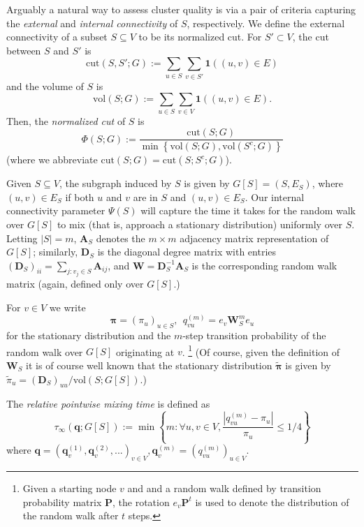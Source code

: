 \documentclass{article}
\newcommand{\set}[1]{\left\{#1\right\}}
\newcommand{\vol}{\mathrm{vol}}
\newcommand{\cut}{\mathrm{cut}}
\newcommand{\abs}[1]{\left \lvert #1 \right \rvert}
\newcommand{\1}{\mathbf{1}}
\newcommand{\qbf}{\mathbf{q}}
\newcommand{\pibf}{\bm{\pi}}
\newcommand{\Abf}{\mathbf{A}}
\newcommand{\Wbf}{\mathbf{W}}
\newcommand{\Dbf}{\mathbf{D}}
\theoremstyle{aldenthm}
\theoremstyle{aldenrmrk}
\begin{document}
Arguably a natural way to assess cluster quality is via a pair of criteria capturing the \emph{external} and \emph{internal connectivity} of $S$, respectively.  We define the external connectivity of a subset $S \subseteq V$ to be its normalized cut. For $S' \subset V$, the cut between $S$ and $S'$ is
\begin{equation*}
\cut(S, S'; G) := \sum_{u \in S} \sum_{v \in S'} \1\left((u,v) \in E \right)
\end{equation*}
and the volume of $S$ is
\begin{equation*}
\vol(S; G) := \sum_{u \in S} \sum_{v \in V} \1\left((u,v) \in E \right).
\end{equation*}
Then, the \emph{normalized cut} of $S$ is
\begin{equation}
\label{eqn: norm_cut}
\Phi(S; G) := \frac{\cut(S; G)}{ \min\left\{\vol(S; G), \vol(S^c; G) \right\} }
\end{equation} 
(where we abbreviate $\cut(S; G) = \cut(S; S^c; G)$).


Given $S \subseteq V$, the subgraph induced by $S$ is given by $G[S] = (S, E_S)$, where $(u,v) \in E_S$ if both $u$ and $v$ are in $S$ and $(u,v) \in E_S$.
Our internal connectivity parameter $\Psi(S)$ will capture the time it takes for the random walk over $G[S]$ to mix (that is, approach a stationary distribution) uniformly over $S$. Letting $\abs{S} = m$, $\Abf_S$ denotes the $m \times m$ adjacency matrix representation of $G[S]$; similarly, $\Dbf_S$ is the diagonal degree matrix with entries $(\Dbf_{S})_{ii} = \sum_{j: v_j \in S} \Abf_{ij}$, and $\Wbf = \Dbf_S^{-1} \Abf_S$ is the corresponding random walk matrix (again, defined only over $G[S]$.)

For $v \in V$ we write
\begin{equation}
\label{eqn: random_walk}
\pibf = (\pi_{u})_{u \in S}, ~~ q_{vu}^{(m)} = e_v\Wbf_S^m e_u
\end{equation}
for the stationary distribution and the $m$-step transition probability of the random walk over $G[S]$ originating at $v$.
\footnote{Given a starting node $v$ and and a random walk defined by transition probability matrix $\mathbf{P}$, the rotation $e_v \mathbf{P}^t$ is used to denote the distribution of the random walk after $t$ steps. }
(Of course, given the definition of $\Wbf_S$ it is of course well known that the stationary distribution $\widetilde{\pibf}$ is given by $\widetilde{\pi}_{u} = (\Dbf_{S})_{uu} / \vol(S; G[S])$.)

The \emph{relative pointwise mixing time} is defined as 
\begin{equation*}
\tau_{\infty}(\qbf; G[S]) := \min\set{m: \forall u,v \in V, \frac{\abs{q_{vu}^{(m)} - \pi_u}}{\pi_u} \leq 1/4} 
\end{equation*}
where $\qbf = (\qbf_v^{(1)}, \qbf_v^{(2)}, ...)_{v \in V}, \qbf_v^{(m)} = (q_{vu}^{(m)})_{u \in V}$. 
\end{document}
